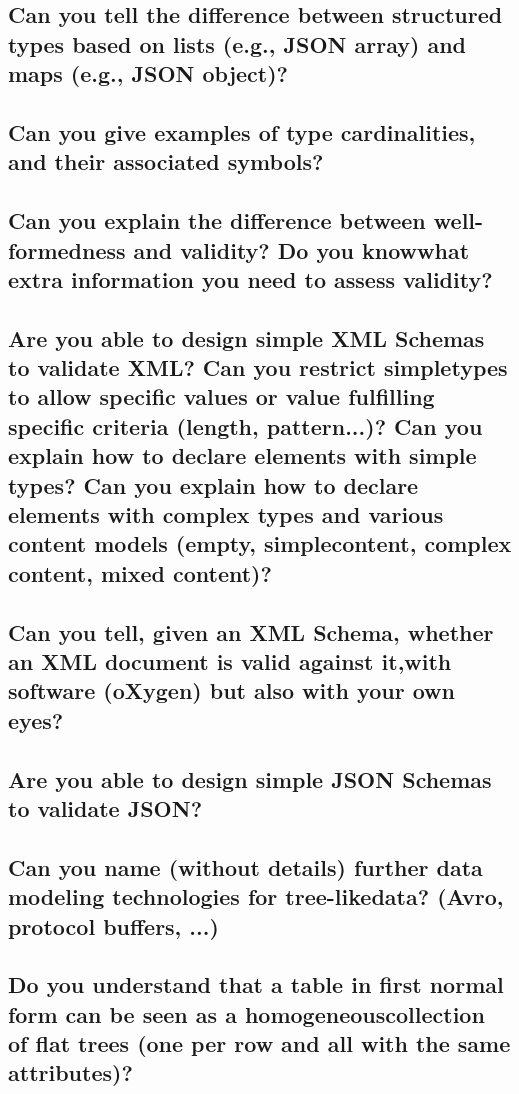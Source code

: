 \documentclass{article}
\begin{document}
\subsection{Can you tell the difference between structured types based on lists (e.g., JSON array) and maps (e.g., JSON object)?}
\subsection{Can you give examples of type cardinalities, and their associated symbols?}
\subsection{Can you explain the difference between well-formedness and validity? Do you knowwhat extra information you need to assess validity?}
\subsection{Are you able to design simple XML Schemas to validate XML? Can you restrict simpletypes to allow specific values or value fulfilling specific criteria (length, pattern...)? Can you explain how to declare elements with simple types? Can you explain how to declare elements with complex types and various content models (empty, simplecontent, complex content, mixed content)?}
\subsection{Can you tell, given an XML Schema, whether an XML document is valid against it,with software (oXygen) but also with your own eyes?}
\subsection{Are you able to design simple JSON Schemas to validate JSON?}
\subsection{Can you name (without details) further data modeling technologies for tree-likedata? (Avro, protocol buffers, ...)}
\subsection{Do you understand that a table in first normal form can be seen as a homogeneouscollection of flat trees (one per row and all with the same attributes)?}

\pagebreak
\end{document}
